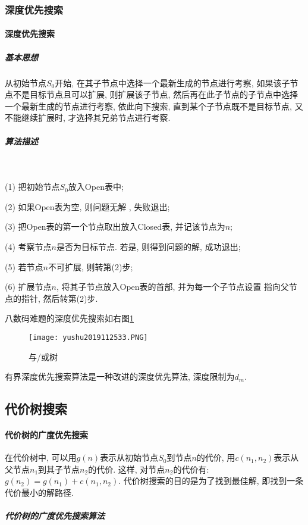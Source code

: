 \subsubsection{深度优先搜索}
\paragraph{深度优先搜索}
\subparagraph{基本思想}
从初始节点$S_0$开始, 在其子节点中选择一个最新生成的节点进行考察, 如果该子节点不是目标节点且可以扩展, 则扩展该子节点, 然后再在此子节点的子节点中选择一个最新生成的节点进行考察, 依此向下搜索, 直到某个子节点既不是目标节点, 又不能继续扩展时, 才选择其兄弟节点进行考察.
\subparagraph{算法描述}~{}

  (1) 把初始节点$S_0$放入Open表中;

  (2) 如果Open表为空, 则问题无解 , 失败退出;

  (3) 把Open表的第一个节点取出放入Closed表, 并记该节点为$n$;

  (4) 考察节点$n$是否为目标节点. 若是, 则得到问题的解, 成功退出;

  (5) 若节点$n$不可扩展, 则转第(2)步;

  (6) 扩展节点$n$, 将其子节点放入Open表的首部, 并为每一个子节点设置 指向父节点的指针, 然后转第(2)步.
\begin{example}
\end{example}

八数码难题的深度优先搜索如右图\ref{AI32fig33}
\begin{figure}[H]
\centering
\texttt{[image: yushu2019112533.PNG]}
\caption{与/或树 }
\label{AI32fig33}
\end{figure}
有界深度优先搜索算法是一种改进的深度优先算法, 深度限制为$d_m$.
\subsection{代价树搜索}
\paragraph{代价树的广度优先搜索}
 在代价树中, 可以用$g(n)$表示从初始节点$S_0$到节点$n$的代价, 用$c(n_1, n_2)$表示从父节点$n_1$到其子节点$n_2$的代价.
 这样, 对节点$n_2$的代价有: $g(n_2)=g(n_1)+c(n_1, n_2)$. 代价树搜索的目的是为了找到最佳解, 即找到一条代价最小的解路径.
\subparagraph{代价树的广度优先搜索算法}

